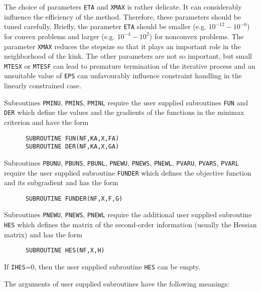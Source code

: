 \documentclass{article}
\begin{document}
\vspace{2mm}

The choice of parameters {\texttt{ETA}} and {\texttt{XMAX}} is rather
delicate. It can considerably influence the efficiency of the
method. Therefore, these parameters should be tuned carefully.
Briefly, the parameter {\texttt{ETA}} should be smaller (e.g.
$10^{-12}-10^{-6}$) for convex problems and larger (e.g.
$10^{-4}-10^2$) for nonconvex problems. The parameter
{\texttt{XMAX}} reduces the stepsize so that it plays an important
role in the neighborhood of the kink. The other parameters are not
so important, but small {\texttt{MTESX}} or {\texttt{MTESF}} can lead
to premature termination of the iterative process and an
unsuitable value of {\texttt{EPS}} can unfavourably influence
constraint handling in the linearly constrained case.

Subroutines {\tt PMINU}, {\tt PMINS}, {\tt PMINL} require the user supplied
subroutines {\tt FUN} and {\tt DER} which define the values and the gradients
of the functions in the minimax criterion and have the form

\begin{verbatim}
      SUBROUTINE FUN(NF,KA,X,FA)
      SUBROUTINE DER(NF,KA,X,GA)
\end{verbatim}

\noindent Subroutines {\tt PBUNU}, {\tt PBUNS}, {\tt PBUNL}, {\tt PNEWU},
{\tt PNEWS}, {\tt PNEWL}, {\tt PVARU}, {\tt PVARS}, {\tt PVARL} require
the user supplied subroutine {\tt FUNDER} which defines the objective
function and its subgradient and has the form

\begin{verbatim}
      SUBROUTINE FUNDER(NF,X,F,G)
\end{verbatim}

\noindent Subroutines {\tt PNEWU}, {\tt PNEWS}, {\tt PNEWL} require the
additional user supplied subroutine {\tt HES} which defines the matrix of the
second-order information (usually the Hessian matrix) and has the form

\begin{verbatim}
      SUBROUTINE HES(NF,X,H)
\end{verbatim}

\noindent If \texttt{IHES}=0, then the user supplied subroutine {\tt HES}
can be empty.

The arguments of user supplied subroutines have the following
meanings:

\vspace{2mm}
\end{document}
